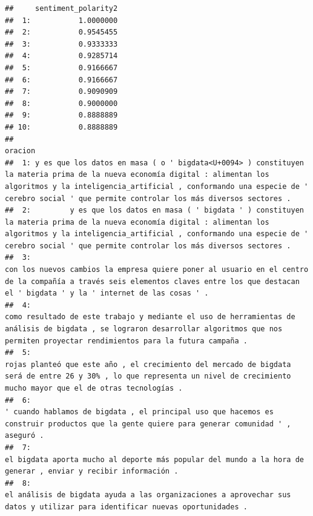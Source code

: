 \documentclass[
]{book}
\begin{document}
\begin{verbatim}
##     sentiment_polarity2
##  1:           1.0000000
##  2:           0.9545455
##  3:           0.9333333
##  4:           0.9285714
##  5:           0.9166667
##  6:           0.9166667
##  7:           0.9090909
##  8:           0.9000000
##  9:           0.8888889
## 10:           0.8888889
##                                                                                                                                                                                                                                                                    oracion
##  1: y es que los datos en masa ( o ' bigdata<U+0094> ) constituyen la materia prima de la nueva economía digital : alimentan los algoritmos y la inteligencia_artificial , conformando una especie de ' cerebro social ' que permite controlar los más diversos sectores .
##  2:         y es que los datos en masa ( ' bigdata ' ) constituyen la materia prima de la nueva economía digital : alimentan los algoritmos y la inteligencia_artificial , conformando una especie de ' cerebro social ' que permite controlar los más diversos sectores .
##  3:                                                                            con los nuevos cambios la empresa quiere poner al usuario en el centro de la compañía a través seis elementos claves entre los que destacan el ' bigdata ' y la ' internet de las cosas ' .
##  4:                                                                          como resultado de este trabajo y mediante el uso de herramientas de análisis de bigdata , se lograron desarrollar algoritmos que nos permiten proyectar rendimientos para la futura campaña .
##  5:                                                                                        rojas planteó que este año , el crecimiento del mercado de bigdata será de entre 26 y 30% , lo que representa un nivel de crecimiento mucho mayor que el de otras tecnologías .
##  6:                                                                                                                            ' cuando hablamos de bigdata , el principal uso que hacemos es construir productos que la gente quiere para generar comunidad ' , aseguró .
##  7:                                                                                                                                                         el bigdata aporta mucho al deporte más popular del mundo a la hora de generar , enviar y recibir información .
##  8:                                                                                                                                            el análisis de bigdata ayuda a las organizaciones a aprovechar sus datos y utilizar para identificar nuevas oportunidades .

\end{verbatim}
\end{document}
